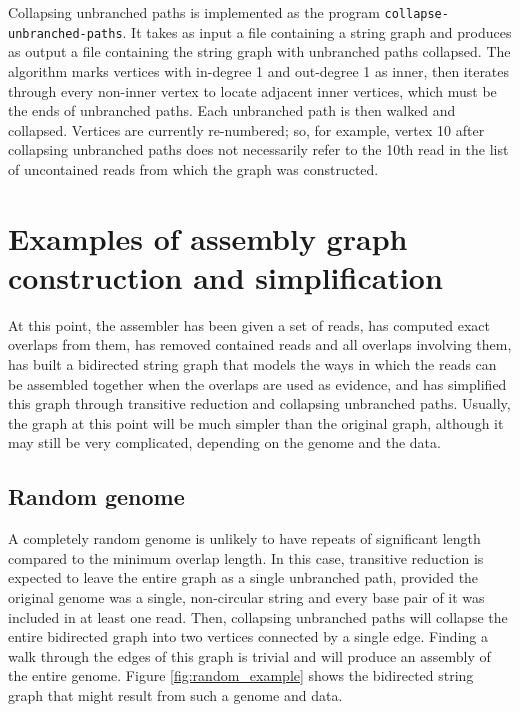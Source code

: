 \documentclass[12pt]{article}
\newcommand{\Figure}[1]{Figure \ref{#1}}
\newcommand{\ProgramName}[1]{{\tt #1}}
\begin{document}
Collapsing unbranched paths is implemented as the program
\ProgramName{collapse-unbranched-paths}.  It takes as input a file containing a
string graph and produces as output a file containing the string graph with
unbranched paths collapsed.  The algorithm marks vertices with in-degree 1 and
out-degree 1 as inner, then iterates through every non-inner vertex to locate
adjacent inner vertices, which must be the ends of unbranched paths.  Each
unbranched path is then walked and collapsed.  Vertices are currently
re-numbered; so, for example, vertex 10 after collapsing unbranched paths does
not necessarily refer to the 10th read in the list of uncontained reads from
which the graph was constructed.

\section{Examples of assembly graph construction and simplification}

At this point, the assembler has been given a set of reads, has computed exact
overlaps from them, has removed contained reads and all overlaps involving them,
has built a bidirected string graph that models the ways in which the reads can
be assembled together when the overlaps are used as evidence, and has simplified
this graph through transitive reduction and collapsing unbranched paths.
Usually, the graph at this point will be much simpler than the original graph,
although it may still be very complicated, depending on the genome and the data.

\subsection{Random genome}

A completely random genome is unlikely to have repeats of significant length
compared to the minimum overlap length.  In this case, transitive reduction is
expected to leave the entire graph as a single unbranched path, provided the
original genome was a single, non-circular string and every base pair of it was
included in at least one read.  Then, collapsing unbranched paths will collapse
the entire bidirected graph into two vertices connected by a single edge.
Finding a walk through the edges of this graph is trivial and will produce an
assembly of the entire genome.  \Figure{fig:random_example} shows the bidirected
string graph that might result from such a genome and data.
\end{document}
